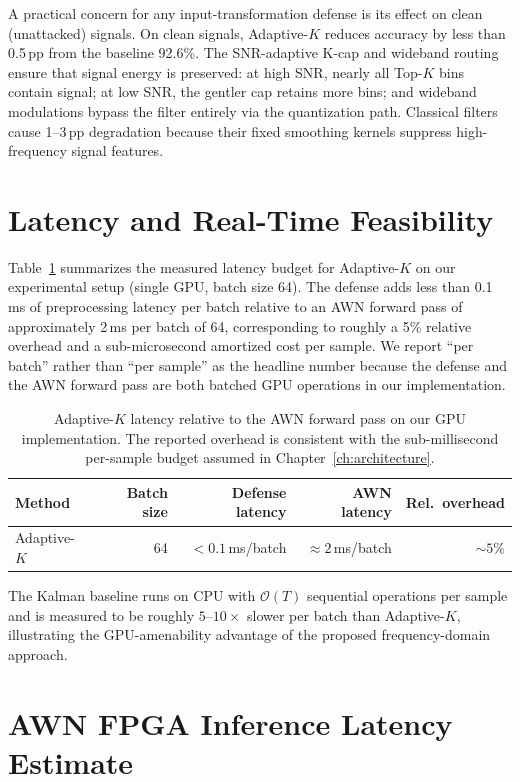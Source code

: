 A practical concern for any input-transformation defense is its effect on
clean (unattacked) signals. On clean signals, Adaptive-$K$ reduces
accuracy by less than 0.5\,pp from the baseline 92.6\%. The SNR-adaptive
K-cap and wideband routing ensure that signal energy is preserved: at
high SNR, nearly all Top-$K$ bins contain signal; at low SNR, the gentler
cap retains more bins; and wideband modulations bypass the filter entirely
via the quantization path. Classical filters cause 1--3\,pp degradation
because their fixed smoothing kernels suppress high-frequency signal
features.

\section{Latency and Real-Time Feasibility}
\label{sec:latency}

Table~\ref{tab:latency} summarizes the measured latency budget for
Adaptive-$K$ on our experimental setup (single GPU, batch size 64).
The defense adds less than 0.1\,ms of preprocessing latency per batch
relative to an AWN forward pass of approximately 2\,ms per batch of 64,
corresponding to roughly a 5\% relative overhead and a sub-microsecond
amortized cost per sample. We report ``per batch'' rather than ``per
sample'' as the headline number because the defense and the AWN forward
pass are both batched GPU operations in our implementation.

\begin{table}[!ht]
\caption{Adaptive-$K$ latency relative to the AWN forward pass on our
  GPU implementation. The reported overhead is consistent with the
  sub-millisecond per-sample budget assumed in
  Chapter~\ref{ch:architecture}.}
\label{tab:latency}
\centering
\small
\begin{tabular}{lrrrr}
\toprule
Method            & Batch size & Defense latency  & AWN latency      & Rel.\ overhead \\
\midrule
Adaptive-$K$   & 64         & $< 0.1$\,ms/batch & $\approx 2$\,ms/batch & $\sim 5\%$ \\
\bottomrule
\end{tabular}
\end{table}

The Kalman baseline runs on CPU with $\mathcal{O}(T)$ sequential operations
per sample and is measured to be roughly $5$--$10\times$ slower per batch
than Adaptive-$K$, illustrating the GPU-amenability advantage of the
proposed frequency-domain approach.

\section{AWN FPGA Inference Latency Estimate}
\label{sec:fpga}

